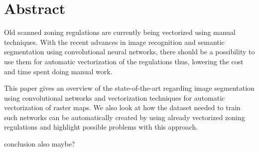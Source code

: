 \section*{Abstract}
Old scanned zoning regulations are currently being vectorized using manual techniques. With the recent advances in image recognition and semantic segmentation using convolutional neural networks, there should be a possibility to use them for automatic vectorization of the regulations thus, lowering the cost and time spent doing manual work.

This paper gives an overview of the state-of-the-art regarding image segmentation using convolutional networks and vectorization techniques for automatic vectorization of raster maps. We also look at how the dataset needed to train such networks can be automatically created by using already vectorized zoning regulations and highlight possible problems with this approach.

conclusion also maybe?